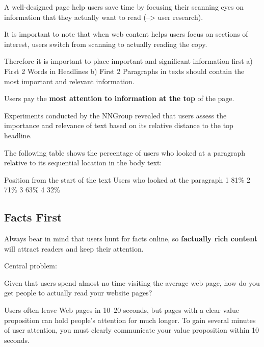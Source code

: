 A well-designed page help users save time by focusing their scanning eyes on information that they actually want to read (--> user research).

It is important to note that when web content helps users focus on sections of interest, users switch from scanning to actually reading the copy.

Therefore it is important to place important and significant information first
a) First 2 Words in Headlines
b) First 2 Paragraphs in texts should contain the most important and relevant information.

Users pay the \textbf{most attention to information at the top} of the page.

Experiments conducted by the NNGroup revealed that users assess the importance and relevance of text based on its relative distance to the top headline. 

The following table shows the percentage of users who looked at a paragraph relative to its sequential location in the body text:

Position from the start of the text	Users who looked at the paragraph
1	81\%
2	71\%
3	63\%
4	32\%



\subsection{Facts First} %
\label{sub:fact_hunting}


Always bear in mind that users hunt for facts online, so \textbf{factually rich content} will attract readers and keep their attention.

Central problem:

Given that users spend almost no time visiting the average web page, how do you get people to actually read your website pages?

Users often leave Web pages in 10–20 seconds, but pages with a clear value proposition can hold people's attention for much longer. To gain several minutes of user attention, you must clearly communicate your value proposition within 10 seconds.

